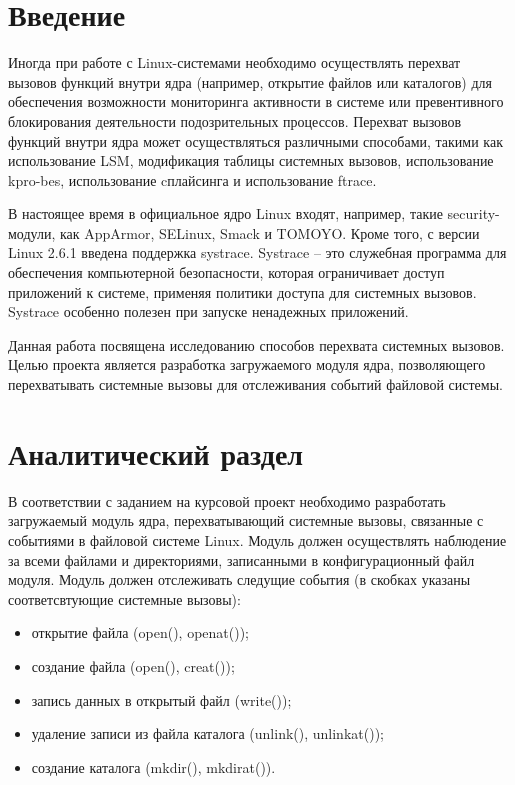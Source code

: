 \documentclass[a4paper,14pt]{article}
\begin{document}
\setcounter{page}{2}
\tableofcontents

\newpage
\section*{Введение}

Иногда при работе с Linux-системами необходимо осуществлять перехват вызовов функций внутри ядра (например, открытие файлов или каталогов) для обеспечения возможности мониторинга активности в системе или превентивного блоки­рования деятельности подозрительных процессов.
Перехват вызовов функций внутри ядра может осуществляться различными способами, такими как использование LSM, модификация таблицы системных вызовов, использование kpro-bes, использование cплайсинга и использование ftrace.

В настоящее время в официальное ядро Linux входят, например, такие security-модули, как AppArmor, SELinux, Smack и TOMOYO. Кроме того, с версии Linux 2.6.1 введена поддержка systrace. Systrace -- это служебная программа для обеспечения компьютерной безопасности, которая ограничивает доступ приложений к системе, применяя политики доступа для системных вызовов. Systrace особенно полезен при запуске ненадежных приложений.

Данная работа посвящена исследованию способов перехвата системных вызовов. Целью проекта является разработка загружаемого модуля ядра, позволяющего перехватывать системные вызовы для отслеживания событий файловой системы.


\newpage
\section{Аналитический раздел}

В соответствии с заданием на курсовой проект необходимо разработать загружаемый модуль ядра, перехватывающий системные вызовы, связанные с событиями в файловой системе Linux. Модуль должен осуществлять наблюдение за всеми файлами и директориями, записанными в конфигурационный файл модуля. Модуль должен отслеживать следущие события (в скобках указаны соответсвтующие системные вызовы):

\begin{itemize}
	\item открытие файла (open(), openat());
	\item создание файла (open(), creat());
	\item запись данных в открытый файл (write()); 
	\item удаление записи из файла каталога (unlink(), unlinkat());
	\item создание каталога (mkdir(), mkdirat()).
\end{itemize}
\end{document}
